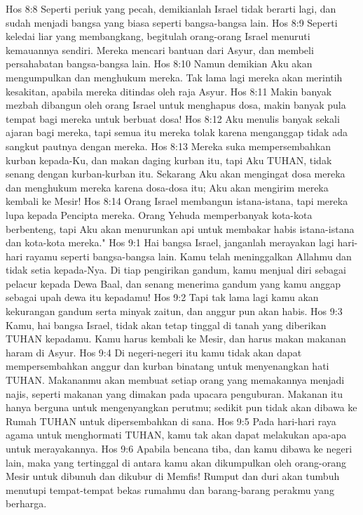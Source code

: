 Hos 8:8  Seperti periuk yang pecah, demikianlah Israel tidak berarti lagi, dan sudah menjadi bangsa yang biasa seperti bangsa-bangsa lain.
Hos 8:9  Seperti keledai liar yang membangkang, begitulah orang-orang Israel menuruti kemauannya sendiri. Mereka mencari bantuan dari Asyur, dan membeli persahabatan bangsa-bangsa lain.
Hos 8:10  Namun demikian Aku akan mengumpulkan dan menghukum mereka. Tak lama lagi mereka akan merintih kesakitan, apabila mereka ditindas oleh raja Asyur.
Hos 8:11  Makin banyak mezbah dibangun oleh orang Israel untuk menghapus dosa, makin banyak pula tempat bagi mereka untuk berbuat dosa!
Hos 8:12  Aku menulis banyak sekali ajaran bagi mereka, tapi semua itu mereka tolak karena menganggap tidak ada sangkut pautnya dengan mereka.
Hos 8:13  Mereka suka mempersembahkan kurban kepada-Ku, dan makan daging kurban itu, tapi Aku TUHAN, tidak senang dengan kurban-kurban itu. Sekarang Aku akan mengingat dosa mereka dan menghukum mereka karena dosa-dosa itu; Aku akan mengirim mereka kembali ke Mesir!
Hos 8:14  Orang Israel membangun istana-istana, tapi mereka lupa kepada Pencipta mereka. Orang Yehuda memperbanyak kota-kota berbenteng, tapi Aku akan menurunkan api untuk membakar habis istana-istana dan kota-kota mereka."
Hos 9:1  Hai bangsa Israel, janganlah merayakan lagi hari-hari rayamu seperti bangsa-bangsa lain. Kamu telah meninggalkan Allahmu dan tidak setia kepada-Nya. Di tiap pengirikan gandum, kamu menjual diri sebagai pelacur kepada Dewa Baal, dan senang menerima gandum yang kamu anggap sebagai upah dewa itu kepadamu!
Hos 9:2  Tapi tak lama lagi kamu akan kekurangan gandum serta minyak zaitun, dan anggur pun akan habis.
Hos 9:3  Kamu, hai bangsa Israel, tidak akan tetap tinggal di tanah yang diberikan TUHAN kepadamu. Kamu harus kembali ke Mesir, dan harus makan makanan haram di Asyur.
Hos 9:4  Di negeri-negeri itu kamu tidak akan dapat mempersembahkan anggur dan kurban binatang untuk menyenangkan hati TUHAN. Makananmu akan membuat setiap orang yang memakannya menjadi najis, seperti makanan yang dimakan pada upacara penguburan. Makanan itu hanya berguna untuk mengenyangkan perutmu; sedikit pun tidak akan dibawa ke Rumah TUHAN untuk dipersembahkan di sana.
Hos 9:5  Pada hari-hari raya agama untuk menghormati TUHAN, kamu tak akan dapat melakukan apa-apa untuk merayakannya.
Hos 9:6  Apabila bencana tiba, dan kamu dibawa ke negeri lain, maka yang tertinggal di antara kamu akan dikumpulkan oleh orang-orang Mesir untuk dibunuh dan dikubur di Memfis! Rumput dan duri akan tumbuh menutupi tempat-tempat bekas rumahmu dan barang-barang perakmu yang berharga.
